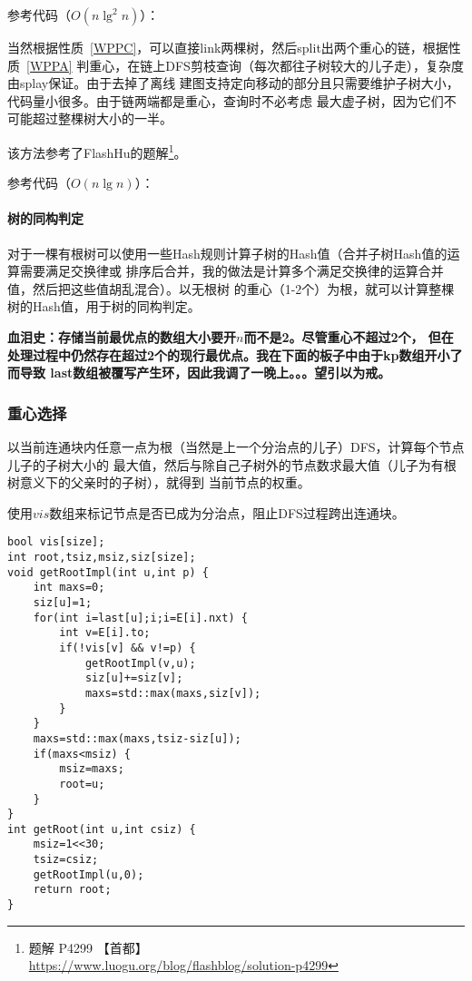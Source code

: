 参考代码（$O(n\lg^2n)$）：


当然根据性质~\ref{WPPC}，可以直接link两棵树，然后split出两个重心的链，根据性质~\ref{WPPA}
判重心，在链上DFS剪枝查询（每次都往子树较大的儿子走），复杂度由splay保证。由于去掉了离线
建图支持定向移动的部分且只需要维护子树大小，代码量小很多。由于链两端都是重心，查询时不必考虑
最大虚子树，因为它们不可能超过整棵树大小的一半。

该方法参考了FlashHu的题解\footnote{
    题解 P4299 【首都】\\
    \url{https://www.luogu.org/blog/flashblog/solution-p4299}
}。

参考代码（$O(n\lg n)$）：


\paragraph{树的同构判定}
对于一棵有根树可以使用一些Hash规则计算子树的Hash值（合并子树Hash值的运算需要满足交换律或
排序后合并，我的做法是计算多个满足交换律的运算合并值，然后把这些值胡乱混合）。以无根树
的重心（1-2个）为根，就可以计算整棵树的Hash值，用于树的同构判定。

{\bfseries 血泪史：存储当前最优点的数组大小要开$n$而不是2。尽管重心不超过2个，
但在处理过程中仍然存在超过2个的现行最优点。我在下面的板子中由于kp数组开小了而导致
last数组被覆写产生环，因此我调了一晚上。。。望引以为戒。}



\subsubsection{重心选择}
以当前连通块内任意一点为根（当然是上一个分治点的儿子）DFS，计算每个节点儿子的子树大小的
最大值，然后与除自己子树外的节点数求最大值（儿子为有根树意义下的父亲时的子树），就得到
当前节点的权重。

使用$vis$数组来标记节点是否已成为分治点，阻止DFS过程跨出连通块。

\begin{lstlisting}[title=getRoot]
bool vis[size];
int root,tsiz,msiz,siz[size];
void getRootImpl(int u,int p) {
    int maxs=0;
    siz[u]=1;
    for(int i=last[u];i;i=E[i].nxt) {
        int v=E[i].to;
        if(!vis[v] && v!=p) {
            getRootImpl(v,u);
            siz[u]+=siz[v];
            maxs=std::max(maxs,siz[v]);
        }
    }
    maxs=std::max(maxs,tsiz-siz[u]);
    if(maxs<msiz) {
        msiz=maxs;
        root=u;
    }
}
int getRoot(int u,int csiz) {
    msiz=1<<30;
    tsiz=csiz;
    getRootImpl(u,0);
    return root;
}
\end{lstlisting}

